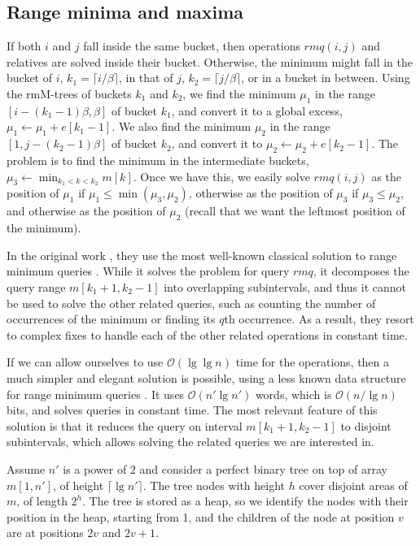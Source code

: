 \documentclass[11pt]{article}
\renewcommand{\log}{\lg}
\newcommand{\0}{\mathit{0}}
\newcommand{\1}{\mathit{1}}
\newcommand{\rmq}{\mathit{rmq}}
\newcommand{\Oh}[1]{\mathcal{O}\!\left(#1\right)}
\begin{document}
\subsection{Range minima and maxima} \label{sec:rmq-large}

If both $i$ and $j$ fall inside the same bucket, then operations $\rmq(i,j)$ 
and relatives are solved inside their bucket.
Otherwise, the minimum might fall in the bucket of $i$, $k_1=\lceil
i/\beta\rceil$, in that of $j$, $k_2=\lceil j/\beta\rceil$,
or in a bucket in between. Using the rmM-trees of buckets $k_1$ and $k_2$, we
find the minimum $\mu_1$ in the range $[i - (k_1-1)\beta,\beta]$ of bucket 
$k_1$, and convert it to a global excess, $\mu_1 \leftarrow \mu_1 + e[k_1-1]$. 
We also find the minimum $\mu_2$ in the range $[1,j - (k_2-1)\beta]$ of 
bucket $k_2$, and convert it to $\mu_2 \leftarrow \mu_2 + e[k_2-1]$. The 
problem is to find the minimum in the intermediate buckets,
$\mu_3 \leftarrow \min_{k_1 < k < k_2} m[k]$. Once we have this, we easily
solve $\rmq(i,j)$ as the position of $\mu_1$ if $\mu_1 \le \min(\mu_3,\mu_2)$,
otherwise as the position of $\mu_3$ if $\mu_3 \le \mu_2$, and otherwise as the
position of $\mu_2$ (recall that we want the leftmost position of the minimum).

In the original work \cite{NS14}, they use the most well-known classical
solution to range minimum queries \cite{BF00}. While it solves the problem
for query $\rmq$, it decomposes the query range $m[k_1+1,k_2-1]$ into 
overlapping subintervals, and thus it cannot be used to solve the other related
queries, such as counting the number of occurrences of the minimum or finding
its $q$th occurrence. As a result, they resort to complex fixes to handle
each of the other related operations in constant time.

If we can allow ourselves to use $\Oh{\log\log n}$ time for the operations,
then a much simpler and elegant solution is possible, using a less known data
structure for range minimum queries \cite{YA10}. It uses $\Oh{n'\log n'}$ 
words, which is $\Oh{n/\log n}$ bits, and solves queries in constant time.
The most relevant feature of this solution is that it reduces the query on
interval $m[k_1+1,k_2-1]$ to disjoint subintervals, which allows solving the
related queries we are interested in.

Assume $n'$ is a power of $2$ and consider a perfect binary tree on top of 
array $m[1,n']$, of height $\lceil \log n'\rceil$. The tree nodes with height
$h$ cover disjoint areas of $m$, of length $2^h$. The tree is stored as a
heap, so we identify the nodes with their position in the heap, starting from
1, and the children of the node at position $v$ are at positions $2v$ 
and $2v+1$.
\end{document}

